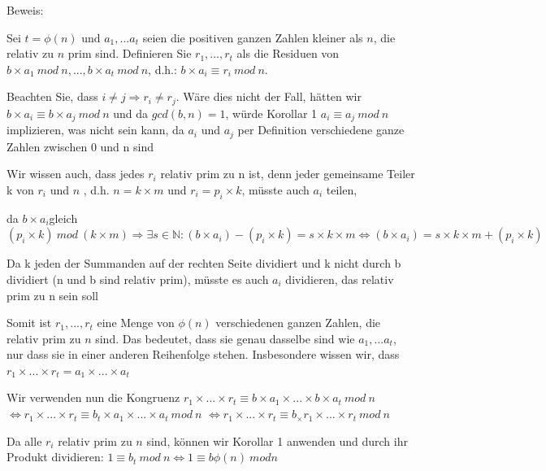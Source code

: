 \documentclass[a4paper]{article}
\begin{document}
\begin{multicols}{3}
\begin{itemize*}
            \begin{itemize*}
                  \item Beweis:
                  \begin{itemize*}
                        \item Sei $t=\phi(n)$ und $a_1,...a_t$ seien die positiven ganzen Zahlen kleiner als $n$, die relativ zu $n$ prim sind. Definieren Sie $r_1,...,r_t$ als die Residuen von $b\times a_1\ mod\ n , ..., b\times a_t\ mod\ n$, d.h.: $b\times a_i \equiv r_i\ mod\ n$.
                        \item Beachten Sie, dass $i\not= j \Rightarrow r_i\not= r_j$. Wäre dies nicht der Fall, hätten wir $b\times a_i\equiv b\times a_j\ mod\ n$ und da $gcd(b,n)=1$, würde Korollar 1 $a_i\equiv a_j\ mod\ n$ implizieren, was nicht sein kann, da $a_i$ und $a_j$ per Definition verschiedene ganze Zahlen zwischen 0 und n sind
                        \item Wir wissen auch, dass jedes $r_i$ relativ prim zu n ist, denn jeder gemeinsame Teiler k von $r_i$ und $n$ , d.h. $n=k\times m$ und $r_i=p_i\times k$, müsste auch $a_i$ teilen,
                        \item da $b\times a_i$gleich $(p_i\times k)\ mod\ (k\times m)\Rightarrow\exists s\in\mathbb{N}:(b\times a_i)-(p_i\times k)=s\times k\times m \Leftrightarrow (b\times a_i)=s\times k\times m+(p_i\times k)$
                        \item Da k jeden der Summanden auf der rechten Seite dividiert und k nicht durch b dividiert (n und b sind relativ prim), müsste es auch $a_i$ dividieren, das relativ prim zu n sein soll
                        \item Somit ist $r_1, ...,r_t$ eine Menge von $\phi(n)$ verschiedenen ganzen Zahlen, die relativ prim zu $n$ sind. Das bedeutet, dass sie genau dasselbe sind wie $a_1,...a_t$, nur dass sie in einer anderen Reihenfolge stehen. Insbesondere wissen wir, dass $r_1\times ...\times r_t=a_1\times ...\times a_t$
                        \item Wir verwenden nun die Kongruenz $r_1\times ...\times r_t\equiv b\times a_1\times ...\times b\times a_t\ mod\ n$ $\Leftrightarrow r_1\times ...\times r_t\equiv b_t\times a_1\times ...\times a_t\ mod\ n$ $\Leftrightarrow r_1\times ...\times r_t\equiv b_\times r_1\times ...\times r_t\ mod\ n$
                        \item Da alle $r_i$ relativ prim zu $n$ sind, können wir Korollar 1 anwenden und durch ihr Produkt dividieren: $1\equiv b_t\ mod\ n \Leftrightarrow 1\equiv b\phi(n)\ mod n$

\end{itemize*}
\end{itemize*}
\end{itemize*}
\end{multicols}
\end{document}
